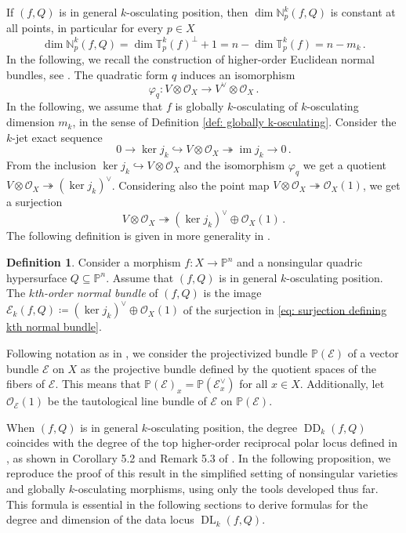 \documentclass[11pt,reqno]{amsart}
\numberwithin{equation}{section}
\theoremstyle{plain}
\numberwithin{theorem}{section}
\theoremstyle{definition}
\newtheorem{definition}[theorem]{Definition}
\newcommand{\N}{\mathbb{N}}
\renewcommand{\P}{\mathbb{P}}
\newcommand{\T}{\mathbb{T}}
\newcommand{\EE}{\mathcal{E}}
\newcommand{\OO}{\mathcal{O}}
\newcommand{\DL}{\operatorname{DL}}
\newcommand{\DD}{\operatorname{DD}}
\newcommand{\image}{\operatorname{im}}
\begin{document}
If $(f,Q)$ is in general $k$-osculating position, then $\dim\N_p^k(f,Q)$ is constant at all points, in particular for every $p\in X$
\begin{equation}\label{eq: dimension normal space}
\dim\N_p^k(f,Q)=\dim\T_p^k(f)^\perp+1= n-\dim\T_p^k(f)=n-m_k\,.
\end{equation}
In the following, we recall the construction of higher-order Euclidean normal bundles, see \cite[Section 4]{piene2022higher}. The quadratic form $q$ induces an isomorphism
\[
\varphi_q\colon V\otimes\OO_X \longrightarrow V^\vee\otimes\OO_X\,.
\]
In the following, we assume that $f$ is globally $k$-osculating of $k$-osculating dimension $m_k$, in the sense of Definition \ref{def: globally k-osculating}.
Consider the $k$-jet exact sequence
\begin{equation}\label{eq: k-jet 2}
0\to \ker j_k \hookrightarrow V\otimes\OO_X \twoheadrightarrow \image j_k \to 0\,.
\end{equation}
From the inclusion $\ker j_k\hookrightarrow V\otimes\OO_X$ and the isomorphism $\varphi_q$ we get a quotient $V\otimes\OO_X\twoheadrightarrow (\ker j_k)^\vee$.
Considering also the point map $V\otimes\OO_X\twoheadrightarrow \OO_X(1)$, we get a surjection
\begin{equation}\label{eq: surjection defining kth normal bundle}
    V\otimes\OO_X\twoheadrightarrow(\ker j_k)^\vee\oplus\OO_X(1)\,.
\end{equation}
The following definition is given in more generality in \cite[Proposition 4.1]{piene2022higher}.
\begin{definition}\label{def: kth normal bundle}
Consider a morphism $f\colon X\to\P^n$ and a nonsingular quadric hypersurface $Q\subseteq\P^n$. Assume that $(f,Q)$ is in general $k$-osculating position.
The {\em $k$th-order normal bundle} of $(f,Q)$ is the image $\EE_k(f,Q)\coloneqq (\ker j_k)^\vee\oplus\OO_X(1)$ of the surjection in \eqref{eq: surjection defining kth normal bundle}.
\end{definition}


Following notation as in \cite{fulton1998intersection}, we consider the projectivized bundle $\P(\EE)$ of a vector bundle $\EE$ on $X$ as the projective bundle defined by the quotient spaces of the fibers of $\EE$. This means that $\P(\EE)_x=\P(\EE_x^\vee)$ for all $x\in X$.
Additionally, let $\OO_\EE(1)$ be the tautological line bundle of $\EE$ on $\P(\EE)$.

When $(f,Q)$ is in general $k$-osculating position, the degree $\DD_k(f,Q)$ coincides with the degree of the top higher-order reciprocal polar locus defined in \cite[\S 5]{piene2022higher}, as shown in Corollary 5.2 and Remark 5.3 of \cite{piene2022higher}. In the following proposition, we reproduce the proof of this result in the simplified setting of nonsingular varieties and globally $k$-osculating morphisms, using only the tools developed thus far. This formula is essential in the following sections to derive formulas for the degree and dimension of the data locus $\DL_k(f,Q)$.
\end{document}
